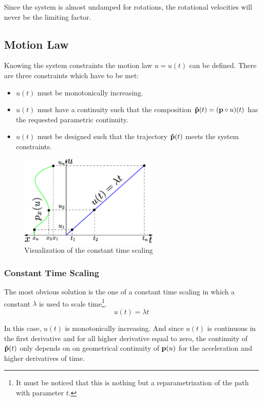 Since the system is almost undamped for rotations, the rotational velocities will never be the limiting factor.

\subsection{Motion Law}
\label{subsec:motionLaw}
Knowing the system constraints the motion law $u=u(t)$ can be defined. There are three constraints which have to be met:

\begin{itemize}
\item $u(t)$ must be monotonically increasing.
\item $u(t)$ must have a  continuity such that the composition ${\bf \tilde{p}}(t)=({\bf p}\circ u)(t)$ has the requested parametric continuity.
\item $u(t)$ must be designed such that the trajectory ${\bf \tilde{p}}(t)$ meets the system constraints.
\end{itemize}

\begin{figure}[H]
	\centering
    \includegraphics[width = 0.6\textwidth]{graphics/constantTimeScaling.eps}
  \caption{Visualization of the constant time scaling}
  \label{fig:constantTimeScaling}
\end{figure}

\subsubsection{Constant Time Scaling}
The most obvious solution is the one of a constant time scaling in which a constant $\lambda$ is used to scale time\footnote{It must be noticed that this is nothing but a reparametrization of the path with parameter $t$.}.
\begin{equation}
u(t) = \lambda t
\end{equation}

In this case, $u(t)$ is monotonically increasing. And since $u(t)$ is continuous in the first derivative and for all higher derivative equal to zero, the continuity of ${\bf \tilde{p}}(t)$ only depends on on geometrical continuity of ${\bf p}(u)$ for the acceleration and higher derivatives of time.

